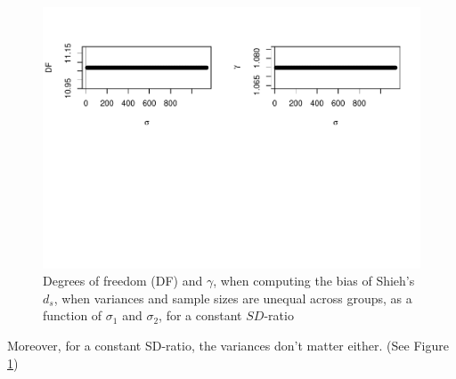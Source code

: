 \documentclass[
  man]{apa6}
\begin{document}
\begin{figure}
\centering
\includegraphics{Theoretical-Bias-of-all-estimators-as-a-function-of-population-parameters_files/figure-latex/biasshiehhetunbalvariance2-1.pdf}
\caption{\label{fig:biasshiehhetunbalvariance2}Degrees of freedom (DF) and \(\gamma\), when computing the bias of Shieh's \(d_s\), when variances and sample sizes are unequal across groups, as a function of \(\sigma_1\) and \(\sigma_2\), for a constant \(SD\)-ratio}
\end{figure}

Moreover, for a constant SD-ratio, the variances don't matter either. (See Figure \ref{fig:biasshiehhetunbalvariance2})
\end{document}
